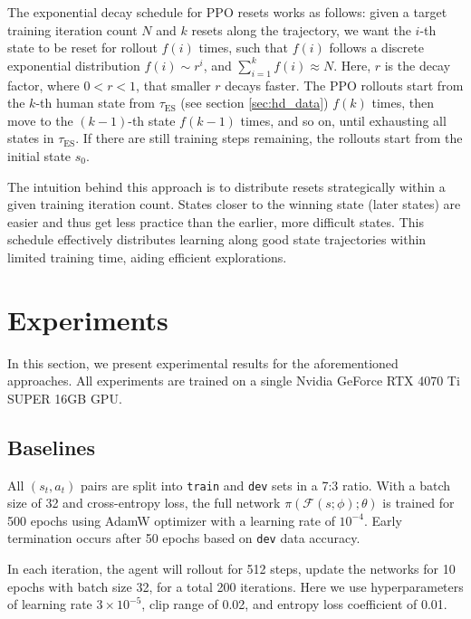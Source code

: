 \documentclass{article}
\begin{document}
The exponential decay schedule for PPO resets works as follows: given a target 
training iteration count $N$ and $k$ resets along the trajectory, we want the 
$i$-th state to be reset for rollout $f(i)$ times, such that $f(i)$ follows a 
discrete exponential distribution $f(i) \sim r^i$, and $\sum_{i=1}^{k} f(i) 
\approx N$. Here, $r$ is the decay factor, where $0 < r < 1$, that smaller $r$ decays 
faster. The PPO rollouts start from the $k$-th human state from 
$\tau_{\text{ES}}$ (see section \ref{sec:hd_data}) $f(k)$ times, then move to 
the $(k-1)$-th state $f(k-1)$ times, and so on, until exhausting all states in 
$\tau_{\text{ES}}$. If there are still training steps remaining, the rollouts 
start from the initial state $s_0$.

The intuition behind this approach is to distribute resets strategically 
within a given training iteration count. States closer to the winning 
state (later states) are easier and thus get less practice than the 
earlier, more difficult states. This schedule effectively distributes 
learning along good state trajectories within limited training time, 
aiding efficient explorations.




\section{Experiments}
In this section, we present experimental results for the aforementioned 
approaches. All experiments are trained on a single Nvidia GeForce RTX 4070 Ti 
SUPER 16GB GPU.

\subsection{Baselines}
All $(s_t, a_t)$ 
pairs are split into \texttt{train} and \texttt{dev} sets in a 7:3 ratio. 
With a batch size of 32 and cross-entropy loss, the full network 
$\pi(\mathcal{F}(s; \phi);\theta)$ is trained for 500 epochs using 
AdamW optimizer with a learning rate of $10^{-4}$. Early termination 
occurs after 50 epochs based on \texttt{dev} data accuracy.

In each iteration, the agent will rollout for 512 steps,
update the networks for 10 epochs with batch size 32, for a total 200 iterations.
Here we use hyperparameters of learning rate
$3\times10^{-5}$, clip range of 0.02, and entropy loss
coefficient of 0.01.
\end{document}
